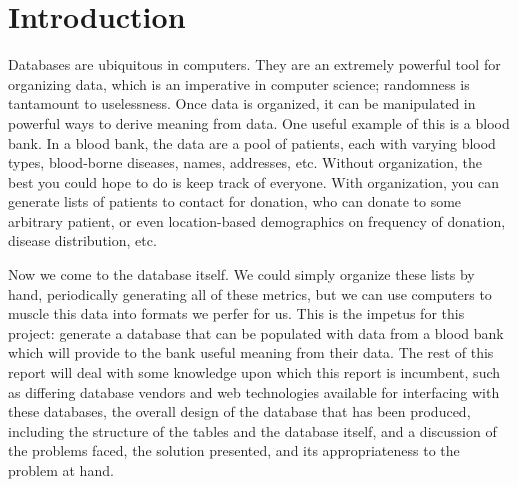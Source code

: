 \documentclass[runningheads,a4paper]{llncs}
\begin{document}
\section{Introduction}\label{sec:intro}
Databases are ubiquitous in computers. They are an extremely powerful tool for organizing data, which is an imperative in computer science; randomness is tantamount to uselessness. Once data is organized, it can be manipulated in powerful ways to derive meaning from data. One useful example of this is a blood bank. In a blood bank, the data are a pool of patients, each with varying blood types, blood-borne diseases, names, addresses, etc. Without organization, the best you could hope to do is keep track of everyone. With organization, you can generate lists of patients to contact for donation, who can donate to some arbitrary patient, or even location-based demographics on frequency of donation, disease distribution, etc.

Now we come to the database itself. We could simply organize these lists by hand, periodically generating all of these metrics, but we can use computers to muscle this data into formats we perfer for us. This is the impetus for this project: generate a database that can be populated with data from a blood bank which will provide to the bank useful meaning from their data. The rest of this report will deal with some knowledge upon which this report is incumbent, such as differing database vendors and web technologies available for interfacing with these databases, the overall design of the database that has been produced, including the structure of the tables and the database itself, and a discussion of the problems faced, the solution presented, and its appropriateness to the problem at hand.

\end{document}
